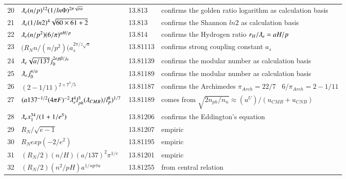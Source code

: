 \documentclass[a4paper,9pt]{article}
\begin{document}
\begin{appendix}
\begin{table}
\begin{tabular}{llll}
    
    20 & $\lambdabar_{e} (n/p)^{12} (1/ln{\Phi}) ^{2\pi\sqrt{e a}} $ & 13.813 & confirms the golden ratio logarithm as calculation basis\\
    21 & $\lambdabar_{e} (1/ln2)^4\sqrt{60 \times 61+2} $ & 13.813 & confirms the Shannon $ln2$ as calculation basis\\
    22 & $\lambdabar_{e} (n/p^2) (6/\pi)^{aH/p}$ & 13.814 & confirms the Hydrogen ratio $r_H/\lambdabar_e = aH/p$\\
   
   
   
   23 & $(R_N n/ (n/p^2) (a_s^{2\pi/z\sqrt a}$ & 13.81113 & confirms strong coupling constant $a_s$\\
  
   
  
   24 & $ \lambdabar_{e} \sqrt{a/137} j_0^{2ep\beta/j_0}$ & 13.81139 & confirms the modular number as calculation basis\\ 
   25 & $\lambdabar_{e} j_0^{n/a}$ & 13.81189 & confirms the modular number as calculation basis\\
   26 & $(2-1/11)^{2\times 7^3/5}$ & 13.81187 & confirms the Archimedes $\pi_{Arch} = 22/7~~~~ 6/\pi_{Arch} =2-1/11$\\
   27 & $(a 137^{-1/2}(4\pi F)^{-2} \lambdabar_{e}^4 l_{ph}^3 (\lambdabar_{CMB})/l_P^8)^{1/7}$ & 13.81189 & comes from $\sqrt{2n_{ph}/n_n} \approx (u^U)/(u_{CMB}+u_{CNB})$\\
   28 & $\lambdabar_{e} x_1^{34} /(1+1/e^5)$ & 13.81206 & confirms the Eddington's equation\\
   29 & $R_N /\sqrt {e-1}$ & 13.81207 & empiric\\
   30 & $R_N exp(-2/e^2)$ & 13.81195 & empiric\\
   31 & $(R_N/2)(n/H)(a/137)^2 \pi^{1/e}$ & 13.81201 & empiric\\
   
   
   32 & $(R_N/2)(n^2/pH)a^{1/sqrt a}$ & 13.81255 & from central relation\\
   
   
   

\end{tabular}
\end{table}
\end{appendix}
\end{document}
